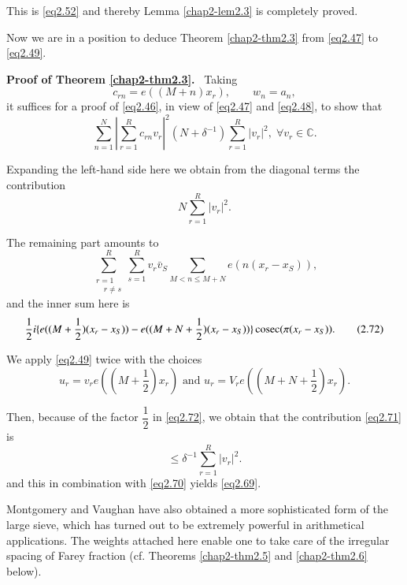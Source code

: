 This is \eqref{eq2.52} and thereby Lemma \ref{chap2-lem2.3} is
completely proved. 

Now we are in a position to deduce Theorem \ref{chap2-thm2.3} from
\eqref{eq2.47} to \eqref{eq2.49}. 

\medskip
\noindent
\textbf{Proof of Theorem \ref{chap2-thm2.3}.}~ Taking
\begin{equation*}
c_{rn}=e((M+n)x_r),\qquad w_n=a_n, \tag{2.68}\label{eq2.68}
\end{equation*}
it suffices for a proof of \eqref{eq2.46}, in view of \eqref{eq2.47}
and \eqref{eq2.48}, to show that 
\begin{equation*}
\sum^{N}_{n=1} | \sum^{R}_{r=1}c_{rn} v_r |^2 (N+ \delta^{-1})
\sum^{R}_{r=1}|v_r|^2, \; \forall v_r \in  \mathbb{C}. \tag{2.69}\label{eq2.69} 
\end{equation*}

Expanding the left-hand side here we obtain from the diagonal terms
the contribution 
\begin{equation*}
N \sum^{R}_{r=1}|v_r|^2. \tag{2.70}\label{eq2.70}
\end{equation*}

The remaining part amounts to
\begin{equation*}
\sum^{R}_{\substack{r=1 \\ \quad r \neq s}} \sum^{R}_{s = 1} v_r
\bar{v}_S \sum_{M < n \leq M+N} e(n(x_r-x_S)), \tag{2.71}\label{eq2.71} 
\end{equation*}
and the inner sum here is
\begin{equation*}
\frac{1}{2}i \{ e(
(M+\frac{1}{2})(x_r-x_S))-e((M+N+\frac{1}{2})(x_r-x_S))\} \operatorname{cosec}
(\pi(x_r-x_S)). \tag{2.72}\label{eq2.72} 
\end{equation*}\pageoriginale

We apply \eqref{eq2.49} twice with the choices
\begin{equation*}
u_r=v_re((M+\frac{1}{2})x_r) \text{ and } u_r=V_r
e((M+N+\frac{1}{2})x_r). \tag{2.73}\label{eq2.73} 
\end{equation*}

Then, because of the factor $\dfrac{1}{2}$ in \eqref{eq2.72}, we obtain that
the contribution \eqref{eq2.71} is  
\begin{equation*}
\leq \delta^{-1}\sum^{R}_{r=1} |v_r|^{2}. \tag{2.74}\label{eq2.74}
\end{equation*}
and this in combination with \eqref{eq2.70} yields \eqref{eq2.69}.

Montgomery and Vaughan \cite{key2} have also obtained a more
sophisticated form of the large sieve, which has turned out to be
extremely powerful in arithmetical applications. The weights attached
here enable one to take care of the irregular spacing of Farey
fraction (cf. Theorems \ref{chap2-thm2.5} and \ref{chap2-thm2.6} below). 


